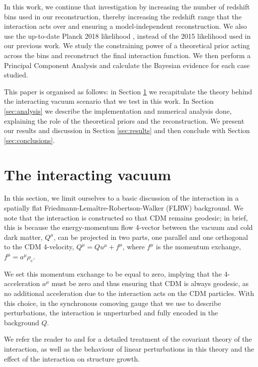 \documentclass[final,3p,times,twocolumn]{elsarticle}
\begin{document}
In this work, we continue that investigation by increasing the number of redshift bins used in our reconstruction, thereby increasing the redshift range that the interaction acts over and ensuring a model-independent reconstruction. We also use the up-to-date Planck 2018 likelihood \cite{Aghanim:2018eyx}, instead of the 2015 likelihood used in our previous work. We study the constraining power of a theoretical prior acting across the bins and reconstruct the final interaction function. We then perform a Principal Component Analysis and calculate the Bayesian evidence for each case studied.

This paper is organised as follows: in Section \ref{sec:theory} we recapitulate the theory behind the interacting vacuum scenario that we test in this work. In Section \ref{sec:analysis} we describe the implementation and numerical analysis done, explaining the role of the theoretical priors and the reconstruction. We present our results and discussion in Section \ref{sec:results} and then conclude with Section \ref{sec:conclusions}.

\section{The interacting vacuum}\label{sec:theory}
In this section, we limit ourselves to a basic discussion of the interaction in a spatially flat Friedmann-Lema\^{i}tre-Robertson-Walker (FLRW) background. We note that the interaction is constructed so that CDM remains geodesic; in brief, this is because the energy-momentum flow 4-vector between the vacuum and cold dark matter, $Q^\mu$, can be projected in two parts, one parallel and one orthogonal to the CDM 4-velocity, $Q^\mu = Qu^\mu + f^\mu$, where $f^\mu$ is the momentum exchange, $f^\mu = a^\mu \rho_c$.

We set this momentum exchange to be equal to zero, implying that the 4-acceleration $a^\mu$ must be zero and thus ensuring that CDM is always geodesic, as no additional acceleration due to the interaction acts on the CDM particles. With this choice, in the synchronous comoving gauge that we use to describe perturbations, the interaction is unperturbed and fully encoded in the background $Q$.

We refer the reader to \cite{Wands:2012vg} and \cite{Martinelli:2019dau} for a detailed treatment of the covariant theory of the interaction, as well as the behaviour of linear perturbations in this theory and the effect of the interaction on structure growth.
\end{document}
